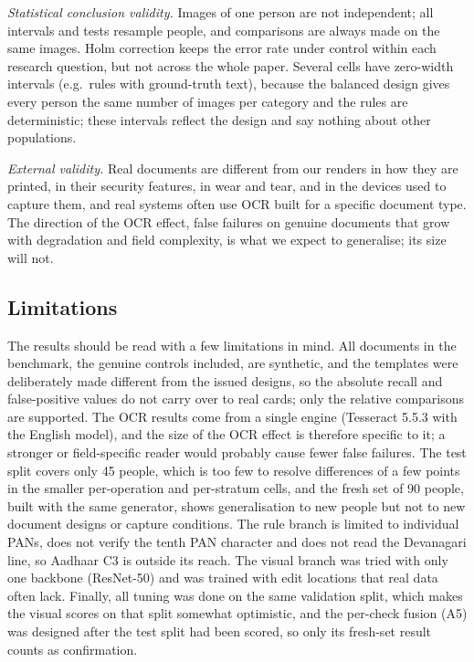 \documentclass[12pt]{article}
\begin{document}
\emph{Statistical conclusion validity.} Images of one person are not
independent; all intervals and tests resample people, and comparisons are always made on the same images. Holm correction keeps the error rate under control within each research question, but not across the whole paper. Several cells have
zero-width intervals (e.g.\ rules with ground-truth text), because the
balanced design gives every person the same number of images per
category and the rules are deterministic; these intervals reflect the
design and say nothing about other populations.

\emph{External validity.} Real documents are different from our renders in how they are printed, in their security features, in wear and tear, and in the devices used to capture them, and real systems often use OCR built for a specific document type. The direction of
the OCR effect, false failures on genuine documents that grow with
degradation and field complexity, is what we expect to generalise; its
size will not.

\subsection{Limitations}
\label{subsec:limitations}

The results should be read with a few limitations in mind. All documents
in the benchmark, the genuine controls included, are synthetic, and the
templates were deliberately made different from the issued designs, so
the absolute recall and false-positive values do not carry over to real
cards; only the relative comparisons are supported. The OCR results
come from a single engine (Tesseract 5.5.3 with the English model), and
the size of the OCR effect is therefore specific to it; a stronger or
field-specific reader would probably cause fewer false failures. The
test split covers only 45 people, which is too few to resolve
differences of a few points in the smaller per-operation and per-stratum
cells, and the fresh set of 90 people, built with the same generator,
shows generalisation to new people but not to new document designs or
capture conditions. The rule branch is limited to individual PANs, does
not verify the tenth PAN character and does not read the Devanagari
line, so Aadhaar C3 is outside its reach. The visual branch was tried
with only one backbone (ResNet-50) and was trained with edit locations
that real data often lack. Finally, all tuning was done on the same
validation split, which makes the visual scores on that split somewhat
optimistic, and the per-check fusion (A5) was designed after the test
split had been scored, so only its fresh-set result counts as
confirmation.
\end{document}
